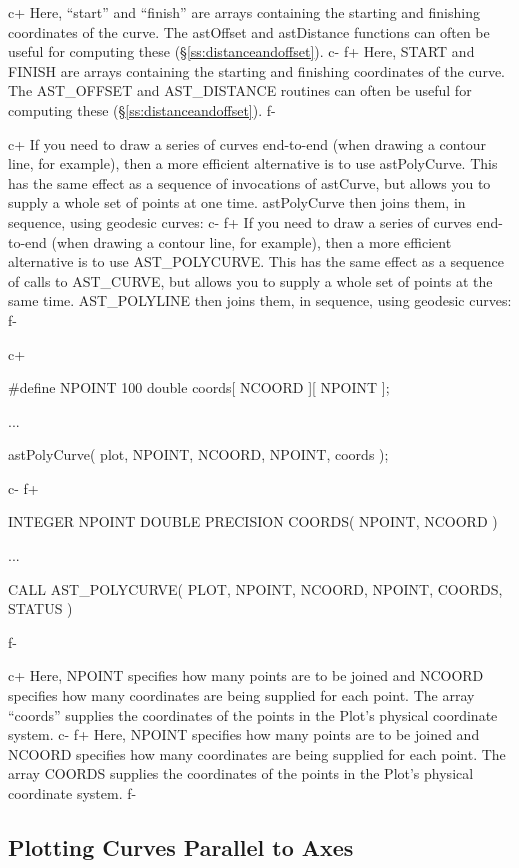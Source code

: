 \documentclass[twoside,11pt]{starlink}
\providecommand{\secref}[1]{\S\ref{#1}}
\begin{document}
c+
Here, ``start'' and ``finish'' are arrays containing the starting and
finishing coordinates of the curve. The astOffset and astDistance
functions can often be useful for computing these
(\secref{ss:distanceandoffset}).
c-
f+
Here, START and FINISH are arrays containing the starting and
finishing coordinates of the curve. The AST\_OFFSET and AST\_DISTANCE
routines can often be useful for computing these
(\secref{ss:distanceandoffset}).
f-

c+
If you need to draw a series of curves end-to-end (when drawing a
contour line, for example), then a more efficient alternative is to
use astPolyCurve. This has the same effect as a sequence of
invocations of astCurve, but allows you to supply a whole set of
points at one time. astPolyCurve then joins them, in sequence, using
geodesic curves:
c-
f+
If you need to draw a series of curves end-to-end (when drawing a
contour line, for example), then a more efficient alternative is to
use AST\_POLYCURVE. This has the same effect as a sequence of calls to
AST\_CURVE, but allows you to supply a whole set of points at the same
time. AST\_POLYLINE then joins them, in sequence, using geodesic
curves:
f-

c+
\small
\begin{terminalv}
#define NPOINT 100
double coords[ NCOORD ][ NPOINT ];

...

astPolyCurve( plot, NPOINT, NCOORD, NPOINT, coords );
\end{terminalv}
\normalsize
c-
f+
\small
\begin{terminalv}
      INTEGER NPOINT
      DOUBLE PRECISION COORDS( NPOINT, NCOORD )

      ...

      CALL AST_POLYCURVE( PLOT, NPOINT, NCOORD, NPOINT, COORDS, STATUS )
\end{terminalv}
\normalsize
f-

c+
Here, NPOINT specifies how many points are to be joined and NCOORD
specifies how many coordinates are being supplied for each point.  The
array ``coords'' supplies the coordinates of the points in the Plot's
physical coordinate system.
c-
f+
Here, NPOINT specifies how many points are to be joined and NCOORD
specifies how many coordinates are being supplied for each point.  The
array COORDS supplies the coordinates of the points in the Plot's
physical coordinate system.
f-

\subsection{Plotting Curves Parallel to Axes}
\end{document}
